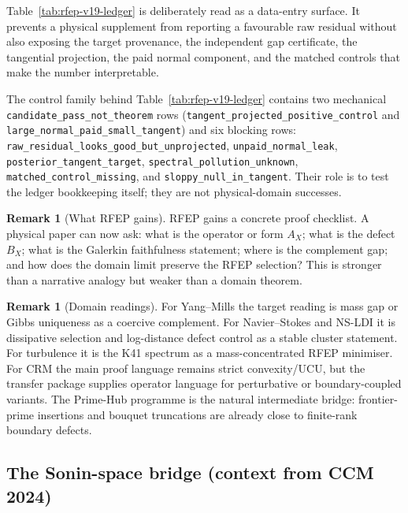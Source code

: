 \documentclass[11pt,a4paper]{article}
\theoremstyle{plain}
\theoremstyle{definition}
\newtheorem{remark}[theorem]{Remark}
\begin{document}
Table~\ref{tab:rfep-v19-ledger} is deliberately read as a data-entry
surface.  It prevents a physical supplement from reporting a favourable
raw residual without also exposing the target provenance, the
independent gap certificate, the tangential projection, the paid normal
component, and the matched controls that make the number interpretable.

The control family behind Table~\ref{tab:rfep-v19-ledger} contains two
mechanical \texttt{candidate\_pass\_not\_theorem} rows
(\texttt{tangent\_projected\_positive\_control} and
\texttt{large\_normal\_paid\_small\_tangent}) and six blocking rows:
\texttt{raw\_residual\_looks\_good\_but\_unprojected},
\texttt{unpaid\_normal\_leak}, \texttt{posterior\_tangent\_target},
\texttt{spectral\_pollution\_unknown},
\texttt{matched\_control\_missing}, and
\texttt{sloppy\_null\_in\_tangent}.  Their role is to test the ledger
bookkeeping itself; they are not physical-domain successes.

\begin{remark}[What RFEP gains]
\label{rem:rfep-gain}
RFEP gains a concrete proof checklist.  A physical paper can now ask:
what is the operator or form $A_X$; what is the defect $B_X$; what
is the Galerkin faithfulness statement; where is the complement gap;
and how does the domain limit preserve the RFEP selection?  This is
stronger than a narrative analogy but weaker than a domain theorem.
\end{remark}

\begin{remark}[Domain readings]
\label{rem:domain-readings}
For Yang--Mills the target reading is mass gap or Gibbs uniqueness
as a coercive complement.  For Navier--Stokes and NS-LDI it is
dissipative selection and log-distance defect control as a stable
cluster statement.  For turbulence it is the K41 spectrum as a
mass-concentrated RFEP minimiser.  For CRM the main proof language
remains strict convexity/UCU, but the transfer package supplies
operator language for perturbative or boundary-coupled variants.
The Prime-Hub programme \cite{PrimeHubSynthesis} is the natural
intermediate bridge: frontier-prime insertions and bouquet
truncations are already close to finite-rank boundary defects.
\end{remark}

\subsection{The Sonin-space bridge (context from CCM 2024)}
\label{sec:sonin}
\end{document}

